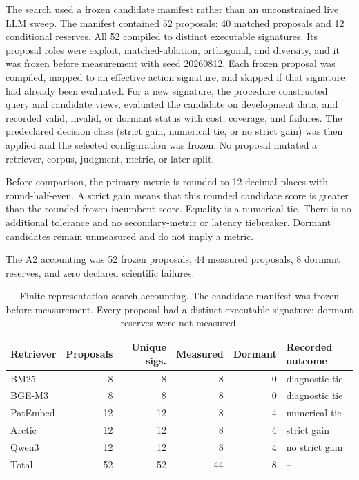 \documentclass[final,5p,times,twocolumn]{elsarticle}
\newenvironment{widejournal}{\begin{table}[!t]}{\end{table}}
\newcommand{\journalTableFont}{\footnotesize}
\newenvironment{widejournal}{\begin{table}[!htbp]}{\end{table}}
\newcommand{\journalTableFont}{\footnotesize}
\begin{document}
The search used a frozen candidate manifest rather than an unconstrained live
LLM sweep. The manifest contained 52 proposals: 40 matched proposals and 12
conditional reserves. All 52 compiled to distinct executable signatures. Its
proposal roles were exploit, matched-ablation,
orthogonal, and diversity, and it was frozen before measurement with seed
20260812. Each frozen proposal was compiled, mapped to an effective action
signature, and skipped if that signature had already been evaluated. For a
new signature, the procedure constructed query and candidate views, evaluated
the candidate on development data, and recorded valid, invalid, or dormant
status with cost, coverage, and failures. The predeclared decision class
(strict gain, numerical tie, or no strict gain) was then applied and the
selected configuration was frozen. No proposal mutated a retriever, corpus,
judgment, metric, or later split.

Before comparison, the primary metric is rounded to 12 decimal places with
round-half-even. A strict gain means that this rounded candidate score is
greater than the rounded frozen incumbent score. Equality is a numerical tie.
There is no additional tolerance and no secondary-metric or latency
tiebreaker. Dormant candidates remain unmeasured and do not imply a metric.

The A2 accounting was 52 frozen proposals, 44 measured proposals, 8 dormant
reserves, and zero declared scientific failures.

\begin{widejournal}
\caption{Finite representation-search accounting. The candidate manifest was
frozen before measurement. Every proposal had a distinct executable
signature; dormant reserves were not measured.}
\label{tab:search-accounting}
\centering
\journalTableFont
\scriptsize
\setlength{\tabcolsep}{2pt}
\sloppy
\begin{tabularx}{\textwidth}{@{}P{1.8cm}r r r r Y@{}}
\toprule
Retriever & Proposals & Unique sigs. & Measured & Dormant & Recorded outcome \\
\midrule
BM25 & 8 & 8 & 8 & 0 & diagnostic tie \\
BGE-M3 & 8 & 8 & 8 & 0 & diagnostic tie \\
PatEmbed & 12 & 12 & 8 & 4 & numerical tie \\
Arctic & 12 & 12 & 8 & 4 & strict gain \\
Qwen3 & 12 & 12 & 8 & 4 & no strict gain \\
Total & 52 & 52 & 44 & 8 & -- \\
\bottomrule
\end{tabularx}
\end{widejournal}
\end{document}
